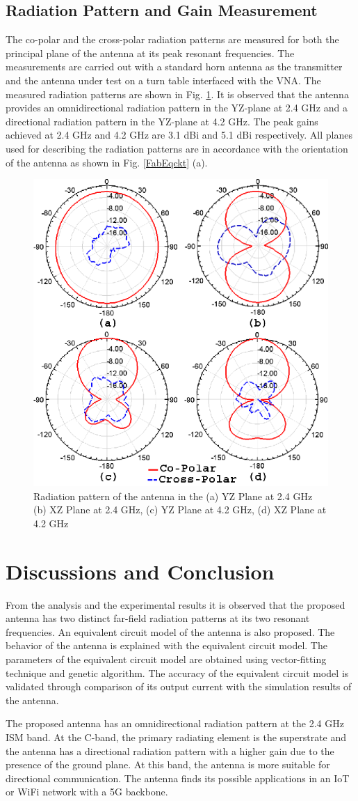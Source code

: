\subsection{Radiation Pattern and Gain Measurement}
The co-polar and the cross-polar radiation patterns are measured for both the principal plane of the antenna at its peak resonant frequencies. The measurements are carried out with a standard horn antenna as the transmitter and the antenna under test on a turn table interfaced with the VNA. The measured radiation patterns are shown in Fig. \ref{fig-pat}. It is observed that the antenna provides an omnidirectional radiation pattern in the YZ-plane at 2.4 GHz and a directional radiation pattern in the YZ-plane at 4.2 GHz. The peak gains achieved at 2.4 GHz and 4.2 GHz are 3.1 dBi and 5.1 dBi respectively. All planes used for describing the radiation patterns are in accordance with the orientation of the antenna as shown in Fig. \ref{FabEqckt} (a).

\begin{figure}[h]
\centering
\includegraphics[width=0.5\linewidth]{Fig-aeue_7.eps}
\caption{Radiation pattern of the antenna in the (a) YZ Plane at 2.4 GHz (b) XZ Plane at 2.4 GHz, (c) YZ Plane at 4.2 GHz, (d) XZ Plane at 4.2 GHz}\label{fig-pat}
\end{figure}

\section{Discussions and Conclusion}\label{c4sec:concl}
From the analysis and the experimental results it is observed that the proposed antenna has two distinct far-field radiation patterns at its two resonant frequencies. An equivalent circuit model of the antenna is also proposed. The behavior of the antenna is explained with the equivalent circuit model. The parameters of the equivalent circuit model are obtained using vector-fitting technique and genetic algorithm. The accuracy of the equivalent circuit model is validated through comparison of its output current with the simulation results of the antenna.

The proposed antenna has an omnidirectional radiation pattern at the 2.4 GHz ISM band. At the C-band, the primary radiating element is the superstrate and the antenna has a directional radiation pattern with a higher gain due to the presence of the ground plane. At this band, the antenna is more suitable for directional communication. The antenna finds its possible applications in an IoT or WiFi network with a 5G backbone. 